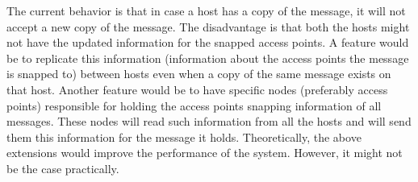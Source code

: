 The current behavior is that in case a host has a copy of the message, it will not accept a new copy of the message. The disadvantage is that both the hosts might not have the updated information for the snapped access points. A feature would be to replicate this information (information about the access points the message is snapped to) between hosts even when a copy of the same message exists on that host.\newline
Another feature would be to have specific nodes (preferably access points) responsible for holding the access points snapping information of all messages. These nodes will read such information from all the hosts and will send them this information for the message it holds.\newline
Theoretically, the above extensions would improve the performance of the system. However, it might not be the case practically.
